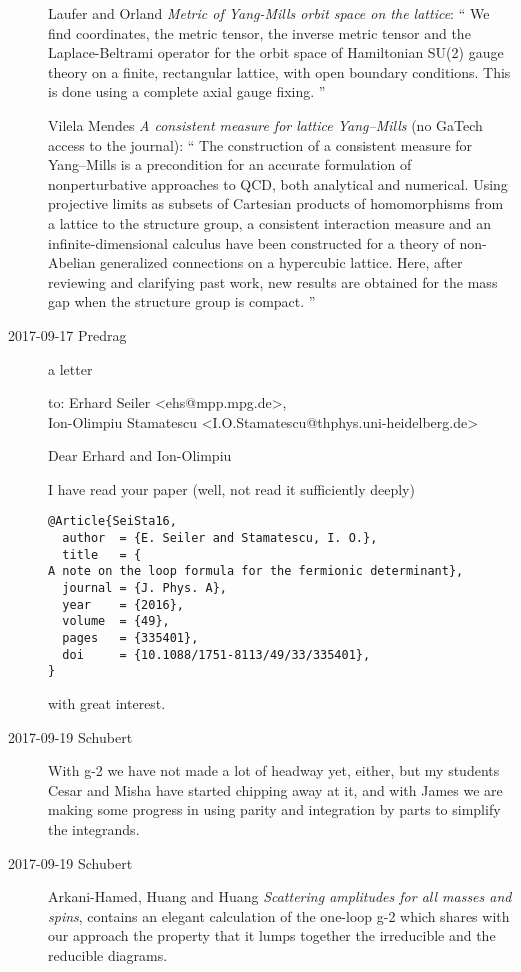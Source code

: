 \begin{description}
Laufer and Orland
{\em Metric of {Yang-Mills} orbit space on the lattice}: ``
We find coordinates, the metric tensor, the inverse metric tensor and the
Laplace-Beltrami operator for the orbit space of Hamiltonian SU(2) gauge
theory on a finite, rectangular lattice, with open boundary conditions. This
is done using a complete axial gauge fixing.
''

Vilela Mendes {\em A consistent measure for lattice Yang–Mills}
(no GaTech access to the journal): ``
The construction of a consistent measure for Yang–Mills is a precondition for
an accurate formulation of nonperturbative approaches to QCD, both analytical
and numerical. Using projective limits as subsets of Cartesian products of
homomorphisms from a lattice to the structure group, a consistent interaction
measure and an infinite-dimensional calculus have been constructed for a
theory of non-Abelian generalized connections on a hypercubic lattice. Here,
after reviewing and clarifying past work, new results are obtained for the
mass gap when the structure group is compact.
''

\item[2017-09-17 Predrag]
a letter

to: Erhard Seiler <ehs@mpp.mpg.de>,\\
    Ion-Olimpiu Stamatescu <I.O.Stamatescu@thphys.uni-heidelberg.de>

\bigskip

Dear Erhard and Ion-Olimpiu

I have read your paper (well, not read it sufficiently deeply)
\begin{verbatim}
@Article{SeiSta16,
  author  = {E. Seiler and Stamatescu, I. O.},
  title   = {
A note on the loop formula for the fermionic determinant},
  journal = {J. Phys. A},
  year    = {2016},
  volume  = {49},
  pages   = {335401},
  doi     = {10.1088/1751-8113/49/33/335401},
}
\end{verbatim}
with great interest.

\item[2017-09-19 Schubert]
With g-2 we have not made a lot of headway yet, either, but my students Cesar
and Misha have started chipping away at it,  and with James we are making
some progress in using parity and integration by parts to simplify the
integrands.

\item[2017-09-19 Schubert]
Arkani-Hamed, Huang and Huang
{\em Scattering amplitudes for all masses and spins}, 
 contains an
elegant calculation of the one-loop g-2 which shares with our approach the
property that it lumps together the irreducible and the reducible diagrams.


\end{description}
